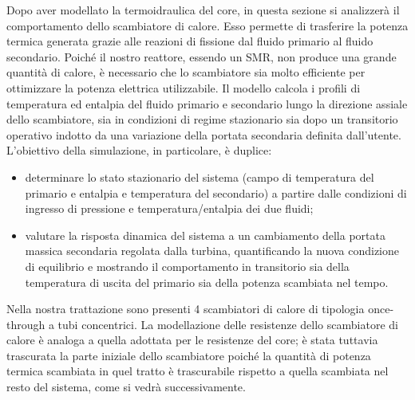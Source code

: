 \documentclass[12pt]{report}
\begin{document}
Dopo aver modellato la termoidraulica del core, in questa sezione si analizzerà il comportamento dello scambiatore di calore. Esso permette di trasferire la potenza termica generata grazie alle reazioni di fissione dal fluido primario al fluido secondario. Poiché il nostro reattore, essendo un SMR, non produce una grande quantità di calore, è necessario che lo scambiatore sia molto efficiente per ottimizzare la potenza elettrica utilizzabile. Il modello calcola i profili di temperatura ed entalpia del fluido primario e secondario lungo la direzione assiale dello scambiatore, sia in condizioni di regime stazionario sia dopo un transitorio operativo indotto da una variazione della portata secondaria definita dall'utente.\\
L'obiettivo della simulazione, in particolare, è duplice:
\begin{itemize}
    \item determinare lo stato stazionario del sistema (campo di temperatura del primario e entalpia e temperatura del secondario) a partire dalle condizioni di ingresso di pressione e temperatura/entalpia dei due fluidi;
    \item valutare la risposta dinamica del sistema a un cambiamento della portata massica secondaria regolata dalla turbina, quantificando la nuova condizione di equilibrio e mostrando il comportamento in transitorio sia della temperatura di uscita del primario sia della potenza scambiata nel tempo.
\end{itemize}
Nella nostra trattazione sono presenti 4 scambiatori di calore di tipologia once-through a tubi concentrici. La modellazione delle resistenze dello scambiatore di calore è analoga a quella adottata per le resistenze del core; è stata tuttavia trascurata la parte iniziale dello scambiatore poiché la quantità di potenza termica scambiata in quel tratto è trascurabile rispetto a quella scambiata nel resto del sistema, come si vedrà successivamente.
\end{document}
